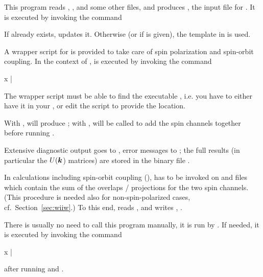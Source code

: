 This program reads , , and some
other files, and produces , the input file for
\wannierx.  It is executed by invoking the command
%
\begin{usage}
  \writewin [-fresh]
\end{usage}

If  already exists,  updates it.
Otherwise (or if  is given), the template in
 is used.



A wrapper script for \wannierx is provided to take care of spin
polarization and spin-orbit coupling.  In the context of \wtow,
\wannierx is executed by invoking the command
%
\begin{usage}
  x \xwannier [-up|-dn|-so|-pp] |
  \xwannier [-up|-dn|-so|-pp]
\end{usage}
%
The wrapper script must be able to find the executable \wannierx,
i.e. you have to either have it in your , or edit the
script  to provide the location.

With , \wannierx will produce ; with
, \wiiwaddsp will be called to add the spin channels
together before running \wannierx.

Extensive diagnostic output goes to , error messages
to ; the full results (in particular the $U(\boldsymbol k$)
matrices) are stored in the binary file .



In calculations including spin-orbit coupling (\soc), \wannier has to
be invoked on  and  files which
contain the sum of the overlaps / projections for the two spin
channels.  (This procedure is needed also for non-spin-polarized
cases, cf.~Section~\ref{sec:wiiw}.)  To this end, 
reads ,  and writes
, .

There is usually no need to call this program manually, it is run by
.  If needed, it is executed by invoking the
command
%
\begin{usage}
  x \wiiwaddsp |
  \wiiwaddsp {}
\end{usage}
%
after running  and .


